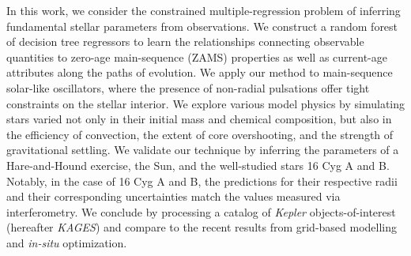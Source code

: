 \documentclass[manuscript]{aastex}
\begin{document}

In this work, we consider the constrained multiple-regression problem of inferring fundamental stellar parameters from observations. We construct a random forest of decision tree regressors to learn the relationships connecting observable quantities to zero-age main-sequence (ZAMS) properties as well as current-age attributes along the paths of evolution. %
We apply our method to main-sequence solar-like oscillators, where the presence of non-radial pulsations offer tight constraints on the stellar interior. 
We explore various model physics by simulating stars varied not only in their initial mass and chemical composition, but also in the efficiency of convection, the extent of core overshooting, and the strength of gravitational settling. We validate our technique by inferring the parameters of a Hare-and-Hound exercise, the Sun, and the well-studied stars 16 Cyg A and B. Notably, in the case of 16 Cyg A and B, the predictions for their respective radii and their corresponding uncertainties match the values measured via interferometry. We conclude by processing a catalog of \emph{Kepler} objects-of-interest (hereafter \emph{KAGES}) and compare to the recent results from grid-based modelling and \emph{in-situ} optimization. 
\end{document}
